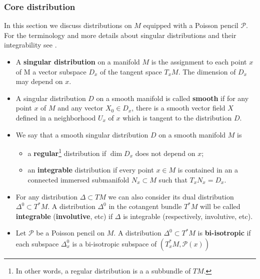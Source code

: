 \documentclass[12pt]{article}
\theoremstyle{definition}
\begin{document}
\subsubsection{Core distribution}

In this section we discuss distributions on $M$ equipped with a Poisson pencil  $\mathcal{P}$. For the terminology and more details about singular distributions and their integrability see \cite{DufourZung05}. 

\begin{itemize}

\item  A \textbf{singular distribution} on a manifold $M$ is the assignment to each point $x$ of M a vector subspace $D_x$ of the tangent space $T_xM$. The dimension of $D_x$ may depend on $x$.

\item A singular distribution $D$ on a smooth manifold is called \textbf{smooth} if for any point $x$ of $M$ and any vector $X_0 \in D_x$, there is a smooth vector field $X$ defined in
a neighborhood $U_x$ of $x$ which is tangent to the distribution $D$. 

\item We say that a smooth singular distribution $D$ on a smooth manifold $M$ is 

\begin{itemize}
\item a \textbf{regular}\footnote{In other words, a regular distribution is a a subbundle of $TM$.} distribution if $\dim D_x$ does not depend on $x$;

\item an \textbf{integrable} distribution if every point $x \in M$ is contained in an a connected immersed submanifold $N_x \subset M$ such that $T_x N_x = D_x$.

\end{itemize}


\item For any distribution $\Delta \subset TM$ we can also consider its dual distribution $\Delta^0 \subset T^*M$.  A distribution $\Delta^0$ in the cotangent bundle $T^*M$ will be called \textbf{integrable} (\textbf{involutive}, etc) if $\Delta$ is integrable (respectively, involutive, etc).


\item Let $\mathcal{P}$ be a Poisson pencil on $M$. A distribution $\Delta^0 \subset T^*M$ is \textbf{bi-isotropic} if each subspace $\Delta^0_x$ is a bi-isotropic subspace of $\left(T^*_x M, \mathcal{P}(x) \right)$

\end{itemize}
\end{document}
